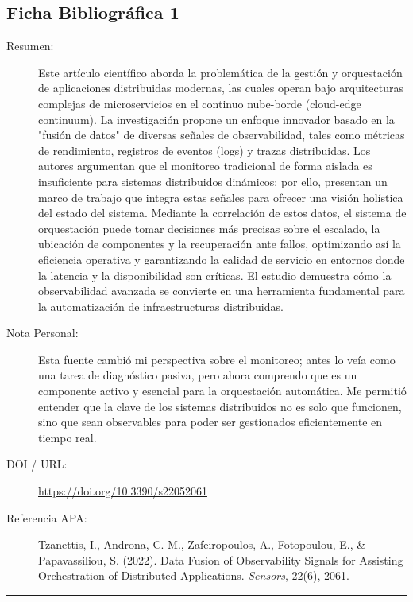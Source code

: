 \documentclass[12pt]{article}
\begin{document}
\subsection{Ficha Bibliográfica 1}
\begin{description}
    \item[Resumen:] Este artículo científico aborda la problemática de la gestión y orquestación de aplicaciones distribuidas modernas, las cuales operan bajo arquitecturas complejas de microservicios en el continuo nube-borde (cloud-edge continuum). La investigación propone un enfoque innovador basado en la "fusión de datos" de diversas señales de observabilidad, tales como métricas de rendimiento, registros de eventos (logs) y trazas distribuidas. Los autores argumentan que el monitoreo tradicional de forma aislada es insuficiente para sistemas distribuidos dinámicos; por ello, presentan un marco de trabajo que integra estas señales para ofrecer una visión holística del estado del sistema. Mediante la correlación de estos datos, el sistema de orquestación puede tomar decisiones más precisas sobre el escalado, la ubicación de componentes y la recuperación ante fallos, optimizando así la eficiencia operativa y garantizando la calidad de servicio en entornos donde la latencia y la disponibilidad son críticas. El estudio demuestra cómo la observabilidad avanzada se convierte en una herramienta fundamental para la automatización de infraestructuras distribuidas.
    \item[Nota Personal:] Esta fuente cambió mi perspectiva sobre el monitoreo; antes lo veía como una tarea de diagnóstico pasiva, pero ahora comprendo que es un componente activo y esencial para la orquestación automática. Me permitió entender que la clave de los sistemas distribuidos no es solo que funcionen, sino que sean observables para poder ser gestionados eficientemente en tiempo real.
    \item[DOI / URL:] \url{https://doi.org/10.3390/s22052061}
    \item[Referencia APA:] Tzanettis, I., Androna, C.-M., Zafeiropoulos, A., Fotopoulou, E., \& Papavassiliou, S. (2022). Data Fusion of Observability Signals for Assisting Orchestration of Distributed Applications. \textit{Sensors}, 22(6), 2061.
\end{description}
\noindent\rule{\textwidth}{0.4pt}
\vspace{3.5cm}
\end{document}
